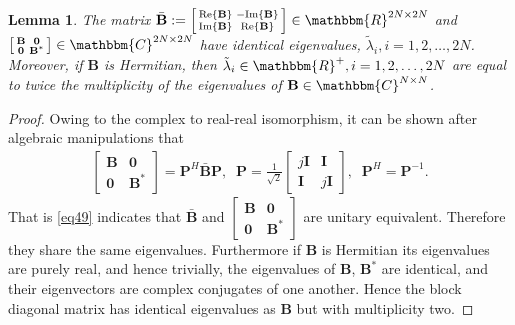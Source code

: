 \documentclass[11pt,draftclsnofoot,onecolumn]{IEEEtran}
\newtheorem{lem}{\bf {Lemma}}
\theoremstyle{definition}
\theoremstyle{remark}
\begin{document}
\begin{lem}\label{lemma6}
The matrix $\bar{\mathbf{B}} :=\left[ \begin{smallmatrix} \mathrm{Re}\{ \mathbf{B} \} & -\mathrm{Im} \{\mathbf{B} \}  \\
\mathrm{Im} \{\mathbf{B} \} & \mathrm{Re}\{ \mathbf{B} \} \end{smallmatrix} \right]\in\mathbbm{R}^{2N\times 2N}$ and $ \left[ \begin{smallmatrix} \mathbf{B} & \mathbf{0} \\ \mathbf{0} & \mathbf{B}^{\ast}  \end{smallmatrix} \right] \in\mathbbm{C}^{2N\times 2N} $ have identical eigenvalues, $\tilde{\lambda}_i,i=1,2,\ldots,2N$.  Moreover, if $\mathbf{B}$ is Hermitian, then $\tilde{\lambda}_i \in \mathbbm{R}^{+},i=1,2,\ldots,2N$ are equal to twice the multiplicity of the eigenvalues of  $\mathbf{B}\in\mathbbm{C}^{N\times N}$.
\end{lem}
\begin{proof} 
Owing to the complex to real-real isomorphism, it can be shown after algebraic manipulations that
\begin{align} \label{eq49}
\left[ \begin{matrix} \mathbf{B} & \mathbf{0} \\ \mathbf{0} & \mathbf{B}^{\ast}  \end{matrix} \right] =\mathbf{P}^{H}\bar{\mathbf{B}}\mathbf{P}, \;\; \mathbf{P}=\frac{1}{\sqrt{2}}\left[ \begin{matrix} j\mathbf{I} & \mathbf{I} \\ \mathbf{I} & j\mathbf{I} \end{matrix} \right], \;\; \mathbf{P}^H=\mathbf{P}^{-1}.
\end{align}
That is \eqref{eq49} indicates that $\bar{\mathbf{B}}$ and $\left[ \begin{smallmatrix} \mathbf{B} & \mathbf{0} \\ \mathbf{0} & \mathbf{B}^{\ast}  \end{smallmatrix} \right]$ are unitary equivalent. Therefore they share the same eigenvalues. Furthermore if $\mathbf{B}$ is Hermitian its eigenvalues are purely real, and  hence trivially,  the eigenvalues of $\mathbf{B}$, $ \mathbf{B}^{\ast}$ are identical, and their eigenvectors are complex conjugates of one another. Hence the block diagonal matrix has identical eigenvalues as $\mathbf{B}$ but with multiplicity two.
\end{proof}
\end{document}
